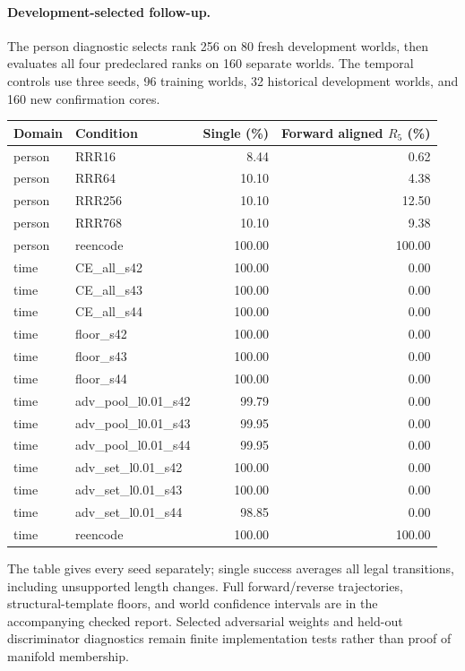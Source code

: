 \paragraph{Development-selected follow-up.}
The person diagnostic selects rank 256 on 80 fresh development worlds, then evaluates all four predeclared ranks on 160 separate worlds. The temporal controls use three seeds, 96 training worlds, 32 historical development worlds, and 160 new confirmation cores.
\begin{center}\begin{tabular}{llrr}\toprule
Domain & Condition & Single (\%) & Forward aligned $R_5$ (\%) \\ \midrule
person & RRR16 & 8.44 & 0.62 \\
person & RRR64 & 10.10 & 4.38 \\
person & RRR256 & 10.10 & 12.50 \\
person & RRR768 & 10.10 & 9.38 \\
person & reencode & 100.00 & 100.00 \\
time & CE\_all\_s42 & 100.00 & 0.00 \\
time & CE\_all\_s43 & 100.00 & 0.00 \\
time & CE\_all\_s44 & 100.00 & 0.00 \\
time & floor\_s42 & 100.00 & 0.00 \\
time & floor\_s43 & 100.00 & 0.00 \\
time & floor\_s44 & 100.00 & 0.00 \\
time & adv\_pool\_l0.01\_s42 & 99.79 & 0.00 \\
time & adv\_pool\_l0.01\_s43 & 99.95 & 0.00 \\
time & adv\_pool\_l0.01\_s44 & 99.95 & 0.00 \\
time & adv\_set\_l0.01\_s42 & 100.00 & 0.00 \\
time & adv\_set\_l0.01\_s43 & 100.00 & 0.00 \\
time & adv\_set\_l0.01\_s44 & 98.85 & 0.00 \\
time & reencode & 100.00 & 100.00 \\
\bottomrule\end{tabular}\end{center}
The table gives every seed separately; single success averages all legal transitions, including unsupported length changes. Full forward/reverse trajectories, structural-template floors, and world confidence intervals are in the accompanying checked report. Selected adversarial weights and held-out discriminator diagnostics remain finite implementation tests rather than proof of manifold membership.
